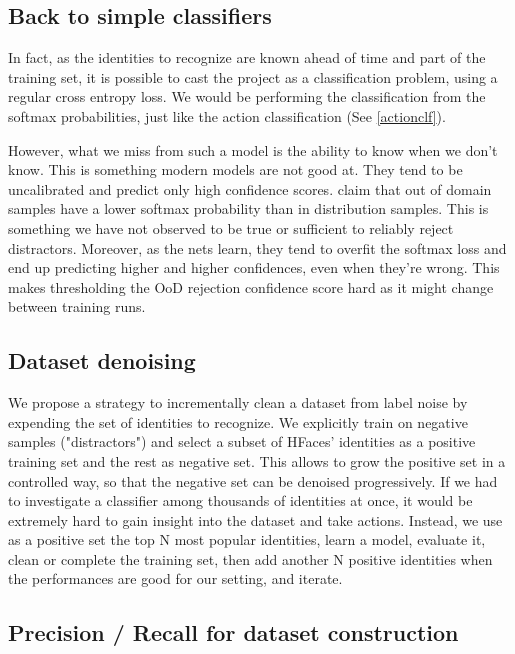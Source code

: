 \subsection{Back to simple classifiers}

In fact, as the identities to recognize are known ahead of time and part of the training set, it is possible to cast the project as a classification problem, using a regular cross entropy loss. We would be performing the classification from the softmax probabilities, just like the action classification (See \ref{actionclf}).

However, what we miss from such a model is the ability to know when we don't know. This is something modern models are not good at. They tend to be uncalibrated and predict only high confidence scores. \citet{softmaxood} claim that out of domain samples have a lower softmax probability than in distribution samples. This is something we have not observed to be true or sufficient to reliably reject distractors. Moreover, as the nets learn, they tend to overfit the softmax loss and end up predicting higher and higher confidences, even when they're wrong. This makes thresholding the \ac{OoD} rejection confidence score hard as it might change between training runs.

\subsection{Dataset denoising}

We propose a strategy to incrementally clean a dataset from label noise by expending the set of identities to recognize. We explicitly train on negative samples ("distractors") and select a subset of HFaces' identities as a positive training set and the rest as negative set. This allows to grow the positive set in a controlled way, so that the negative set can be denoised progressively. If we had to investigate a classifier among thousands of identities at once, it would be extremely hard to gain insight into the dataset and take actions. Instead, we use as a positive set the top N most popular identities, learn a model, evaluate it, clean or complete the training set, then add another N positive identities when the performances are good for our setting, and iterate.

\subsection{Precision / Recall for dataset construction}

